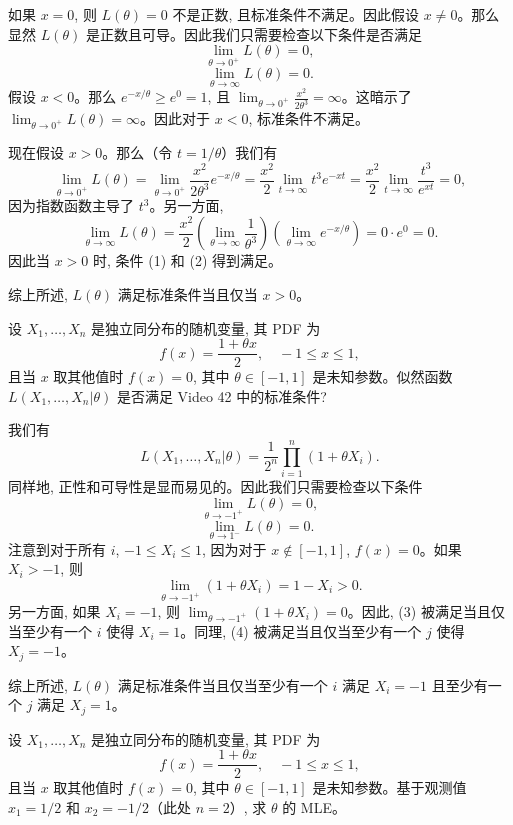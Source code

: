 \begin{questions}
\begin{solution}
如果 $x = 0$, 则 $L(\theta) = 0$ 不是正数, 且标准条件不满足。因此假设 $x \neq 0$。那么显然 $L(\theta)$ 是正数且可导。因此我们只需要检查以下条件是否满足
\[
\lim_{\theta \to 0^+} L(\theta) = 0,
\]
\[
\lim_{\theta \to \infty} L(\theta) = 0.
\]
假设 $x < 0$。那么 $e^{-x/\theta} \ge e^0 = 1$, 且 $\lim_{\theta \to 0^+} \frac{x^2}{2\theta^3} = \infty$。这暗示了 $\lim_{\theta \to 0^+} L(\theta) = \infty$。因此对于 $x < 0$, 标准条件不满足。

现在假设 $x > 0$。那么（令 $t = 1/\theta$）我们有
\[
\lim_{\theta \to 0^+} L(\theta) = \lim_{\theta \to 0^+} \frac{x^2}{2\theta^3} e^{-x/\theta} = \frac{x^2}{2} \lim_{t \to \infty} t^3 e^{-xt} = \frac{x^2}{2} \lim_{t \to \infty} \frac{t^3}{e^{xt}} = 0,
\]
因为指数函数主导了 $t^3$。另一方面,
\[
\lim_{\theta \to \infty} L(\theta) = \frac{x^2}{2} \left( \lim_{\theta \to \infty} \frac{1}{\theta^3} \right) \left( \lim_{\theta \to \infty} e^{-x/\theta} \right) = 0 \cdot e^0 = 0.
\]
因此当 $x > 0$ 时, 条件 (1) 和 (2) 得到满足。

综上所述, $L(\theta)$ 满足标准条件当且仅当 $x > 0$。
\end{solution}

\question
设 $X_1, \dots, X_n$ 是独立同分布的随机变量, 其 PDF 为
\[
f(x) = \frac{1 + \theta x}{2}, \quad -1 \le x \le 1,
\]
且当 $x$ 取其他值时 $f(x) = 0$, 其中 $\theta \in [-1, 1]$ 是未知参数。似然函数 $L(X_1, \dots, X_n | \theta)$ 是否满足 Video 42 中的标准条件?

\begin{solution}
我们有
\[
L(X_1, \dots, X_n | \theta) = \frac{1}{2^n} \prod_{i=1}^n (1 + \theta X_i).
\]
同样地, 正性和可导性是显而易见的。因此我们只需要检查以下条件
\[
\lim_{\theta \to -1^+} L(\theta) = 0,
\]
\[
\lim_{\theta \to 1^-} L(\theta) = 0.
\]
注意到对于所有 $i$, $-1 \le X_i \le 1$, 因为对于 $x \notin [-1, 1]$, $f(x) = 0$。如果 $X_i > -1$, 则
\[
\lim_{\theta \to -1^+} (1 + \theta X_i) = 1 - X_i > 0.
\]
另一方面, 如果 $X_i = -1$, 则 $\lim_{\theta \to -1^+} (1 + \theta X_i) = 0$。因此, (3) 被满足当且仅当至少有一个 $i$ 使得 $X_i = 1$。同理, (4) 被满足当且仅当至少有一个 $j$ 使得 $X_j = -1$。

综上所述, $L(\theta)$ 满足标准条件当且仅当至少有一个 $i$ 满足 $X_i = -1$ 且至少有一个 $j$ 满足 $X_j = 1$。
\end{solution}

\question
设 $X_1, \dots, X_n$ 是独立同分布的随机变量, 其 PDF 为
\[
f(x) = \frac{1 + \theta x}{2}, \quad -1 \le x \le 1,
\]
且当 $x$ 取其他值时 $f(x) = 0$, 其中 $\theta \in [-1, 1]$ 是未知参数。基于观测值 $x_1 = 1/2$ 和 $x_2 = -1/2$（此处 $n = 2$）, 求 $\theta$ 的 MLE。


\end{questions}
